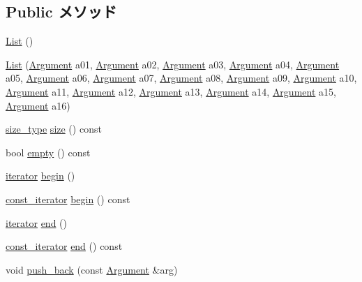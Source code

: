 \subsection*{Public メソッド}
\begin{DoxyCompactItemize}
\item 
\hyperlink{classVarArgs_1_1List_a17e6c90f14225bdac5c65ed915b0a2f6}{List} ()
\item 
\hyperlink{classVarArgs_1_1List_a960eeba7b73e64e05c0af517ecf765be}{List} (\hyperlink{structVarArgs_1_1Argument}{Argument} a01, \hyperlink{structVarArgs_1_1Argument}{Argument} a02, \hyperlink{structVarArgs_1_1Argument}{Argument} a03, \hyperlink{structVarArgs_1_1Argument}{Argument} a04, \hyperlink{structVarArgs_1_1Argument}{Argument} a05, \hyperlink{structVarArgs_1_1Argument}{Argument} a06, \hyperlink{structVarArgs_1_1Argument}{Argument} a07, \hyperlink{structVarArgs_1_1Argument}{Argument} a08, \hyperlink{structVarArgs_1_1Argument}{Argument} a09, \hyperlink{structVarArgs_1_1Argument}{Argument} a10, \hyperlink{structVarArgs_1_1Argument}{Argument} a11, \hyperlink{structVarArgs_1_1Argument}{Argument} a12, \hyperlink{structVarArgs_1_1Argument}{Argument} a13, \hyperlink{structVarArgs_1_1Argument}{Argument} a14, \hyperlink{structVarArgs_1_1Argument}{Argument} a15, \hyperlink{structVarArgs_1_1Argument}{Argument} a16)
\item 
\hyperlink{classVarArgs_1_1List_a1451245dcc01455eaef625ded39c247e}{size\_\-type} \hyperlink{classVarArgs_1_1List_a503ab01f6c0142145d3434f6924714e7}{size} () const 
\item 
bool \hyperlink{classVarArgs_1_1List_ac6e61de369e994009e36f344f99c15ad}{empty} () const 
\item 
\hyperlink{classVarArgs_1_1List_a7b3d64cd6c8b24e05929cb79fde1049d}{iterator} \hyperlink{classVarArgs_1_1List_ad69bd11391be1a1dba5c8202259664f8}{begin} ()
\item 
\hyperlink{classVarArgs_1_1List_afeee0934dfd283471330395273877511}{const\_\-iterator} \hyperlink{classVarArgs_1_1List_aa4b02d4f1a8500fb07a551069060709f}{begin} () const 
\item 
\hyperlink{classVarArgs_1_1List_a7b3d64cd6c8b24e05929cb79fde1049d}{iterator} \hyperlink{classVarArgs_1_1List_acad38d52497a975bfb6f2f6acd76631f}{end} ()
\item 
\hyperlink{classVarArgs_1_1List_afeee0934dfd283471330395273877511}{const\_\-iterator} \hyperlink{classVarArgs_1_1List_a350132543d80a1c1e5be844e6d2878ea}{end} () const 
\item 
void \hyperlink{classVarArgs_1_1List_acee53453c89b2b3e4acb03896bc4d552}{push\_\-back} (const \hyperlink{structVarArgs_1_1Argument}{Argument} \&arg)

\end{DoxyCompactItemize}
